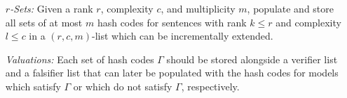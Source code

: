 \documentclass[a4paper, 11pt]{article} %
\newcommand{\tuple}[1]{\langle#1\rangle} %
\newcommand{\set}[1]{\lbrace#1\rbrace} %
\begin{document}
\begin{enumerate}
  \item[\it $r$-Sets:] Given a rank $r$, complexity $c$, and multiplicity $m$, populate and store all sets of at most $m$ hash codes for sentences with rank $k\leq r$ and complexity $l\leq c$ in a $(r,c,m)$-list which can be incrementally extended. 
  \item[\it Valuations:] Each set of hash codes $\Gamma$ should be stored alongside a verifier list and a falsifier list that can later be populated with the hash codes for models which satisfy $\Gamma$ or which do not satisfy $\Gamma$, respectively. 
\end{enumerate}
\end{document}
